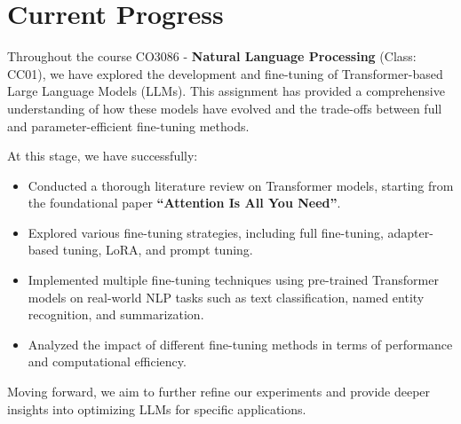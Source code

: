 \section{Current Progress}

Throughout the course CO3086 - \textbf{Natural Language Processing} (Class: CC01), we have explored the development and fine-tuning of Transformer-based Large Language Models (LLMs). This assignment has provided a comprehensive understanding of how these models have evolved and the trade-offs between full and parameter-efficient fine-tuning methods.

At this stage, we have successfully:
\begin{itemize}
    \item Conducted a thorough literature review on Transformer models, starting from the foundational paper \textbf{``Attention Is All You Need''}.
    \item Explored various fine-tuning strategies, including full fine-tuning, adapter-based tuning, LoRA, and prompt tuning.
    \item Implemented multiple fine-tuning techniques using pre-trained Transformer models on real-world NLP tasks such as text classification, named entity recognition, and summarization.
    \item Analyzed the impact of different fine-tuning methods in terms of performance and computational efficiency.
\end{itemize}

Moving forward, we aim to further refine our experiments and provide deeper insights into optimizing LLMs for specific applications.
